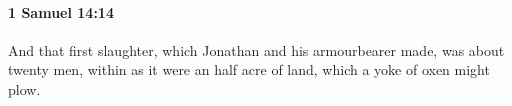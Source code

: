 
		\paragraph{1 Samuel 14:14} %
			\label{1SAMUEL-14-14}

			And that first slaughter, which Jonathan and his armourbearer made, was about twenty men, within as it were an half acre of land, which a yoke of oxen might plow.


